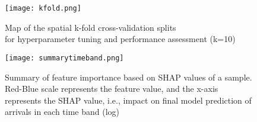 \begin{figure}[ht]
    \centering
    \texttt{[image: kfold.png]}
    \captionsetup{justification=centering}
    \caption{Map of the spatial k-fold cross-validation splits\\for hyperparameter tuning and performance assessment (k=10)}
    \label{fig:kfold}
\end{figure}

\begin{figure}[!ht]
    \centering
    \texttt{[image: summarytimeband.png]}
    \captionsetup{justification=centering}
    \caption{Summary of feature importance based on SHAP values of a sample. Red-Blue scale represents the feature value, and the x-axis represents the SHAP value, i.e., impact on final model prediction of arrivals in each time band (log)}
    \label{fig:beeswarmtimeband}
\end{figure}